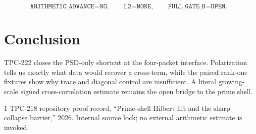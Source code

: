 \documentclass[11pt]{article}
\begin{document}
\[
 \texttt{ARITHMETIC\_ADVANCE=NO},\qquad
 \texttt{L2=NONE},\qquad
 \texttt{FULL\_GATE\_B=OPEN}.
\]

\section{Conclusion}

TPC-222 closes the PSD-only shortcut at the four-packet interface.  Polarization tells us
exactly what data would recover a cross-term, while the paired rank-one fixtures show why
trace and diagonal control are insufficient.  A literal growing-scale signed
cross-correlation estimate remains the open bridge to the prime shell.

\begin{thebibliography}{1}
TPC-218 repository proof record, ``Prime-shell Hilbert lift and the sharp collapse barrier,''
2026.  Internal source lock; no external arithmetic estimate is invoked.
\end{thebibliography}
\end{document}
